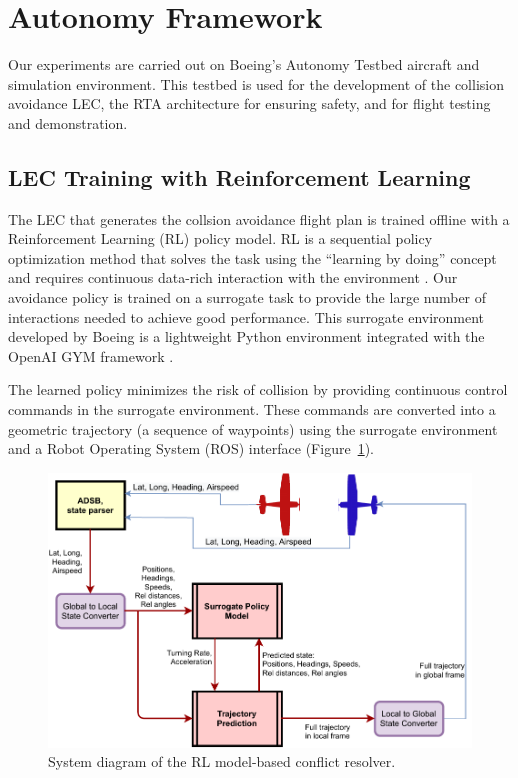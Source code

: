 \section{Autonomy Framework}

Our experiments are carried out on Boeing's Autonomy Testbed aircraft and simulation environment.  This testbed is used for the development of the collision avoidance LEC, the RTA architecture for ensuring safety, and for flight testing and demonstration.  



\subsection{LEC Training with Reinforcement Learning}

The LEC that generates the collsion avoidance flight plan is trained offline with a 
Reinforcement Learning (RL) policy model. 
RL is a sequential policy optimization method that solves the task using the ``learning by doing'' concept and requires continuous data-rich interaction with the environment \cite{sutton2018reinforcement}. 
Our avoidance policy is trained on a surrogate task to provide the large number of interactions needed to achieve good performance. 
This surrogate environment developed by Boeing is a lightweight Python environment integrated with the OpenAI GYM framework \cite{brockman2016openai}.

The learned policy minimizes the risk of collision by providing continuous control commands in the surrogate environment. These commands are converted into a geometric trajectory (a sequence of waypoints) using the surrogate environment and a Robot Operating System (ROS) interface (Figure~\ref{fig:diagram}).

\begin{figure}[h]
	\centering
	\includegraphics[width=\linewidth]{figures/system_overview.pdf}
	\caption{System diagram of the RL model-based conflict resolver.}
	\label{fig:diagram}
\end{figure}


